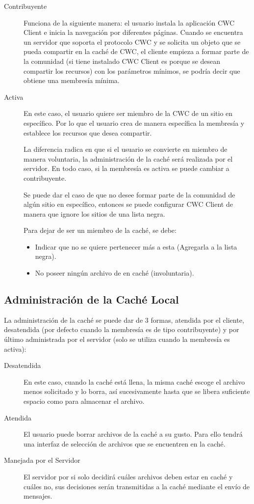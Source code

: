 \begin{description}
\item[Contribuyente] Funciona de la siguiente manera: el usuario instala la aplicación CWC Client e inicia la navegación por diferentes páginas. Cuando se encuentra un servidor que soporta el protocolo CWC y se solicita un objeto que se pueda compartir en la caché de CWC, el cliente empieza a formar parte de la comunidad (si tiene instalado CWC Client es porque se desean compartir los recursos) con los parámetros mínimos, se podría decir que obtiene una membresía mínima.

\item[Activa] En este caso, el usuario quiere ser miembro de la CWC de un sitio en específico. Por lo que el usuario crea de manera específica la membresía y establece los recursos que desea compartir.

La diferencia radica en que si el usuario se convierte en miembro de manera voluntaria, la administración de la caché será realizada por el servidor. En todo caso, si la membresía es activa se puede cambiar a contribuyente.

Se puede dar el caso de que no desee formar parte de la comunidad de algún sitio en específico, entonces se puede configurar CWC Client de manera que ignore los sitios de una lista negra.

Para dejar de ser un miembro de la caché, se debe:

\begin{itemize}
\item Indicar que no se quiere pertenecer más a esta (Agregarla a la lista negra).
\item No poseer ningún archivo de en caché (involuntaria).
\end{itemize}

\end{description}


\subsection{Administración de la Caché Local}

La administración de la caché se puede dar de 3 formas, atendida por el cliente, desatendida (por defecto cuando la membresía es de tipo contribuyente) y por último administrada por el servidor (solo se utiliza cuando la membresía es activa):

\begin{description}
\item[Desatendida] En este caso, cuando la caché está llena, la misma caché escoge el archivo menos solicitado y lo borra, así sucesivamente hasta que se libera suficiente espacio como para almacenar el archivo. 
\item[Atendida] El usuario puede borrar archivos de la caché a su gusto. Para ello tendrá una interfaz de selección de archivos que se encuentren en la caché.
\item[Manejada por el Servidor] El servidor por si solo decidirá cuáles archivos deben estar en caché y cuáles no, sus decisiones serán transmitidas a la caché mediante el envío de mensajes. 
\end{description}


